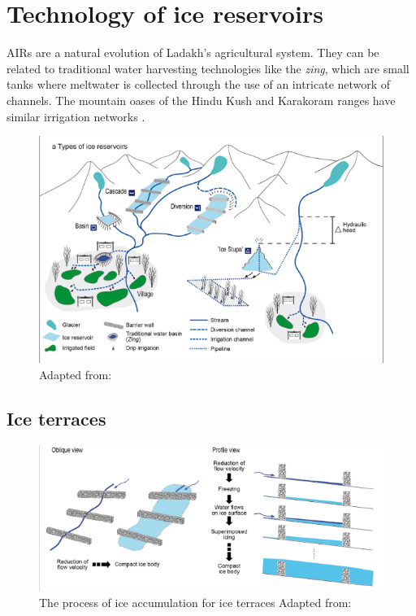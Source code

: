 \chapter{Technology of ice reservoirs}

AIRs are a natural evolution of Ladakh's agricultural system. They can be related to traditional water
harvesting technologies like the {\it zing}, which are small tanks where meltwater is collected through the use
of an intricate network of channels. The mountain oases of the Hindu Kush and Karakoram ranges
have similar irrigation networks \citep{nusserLocalKnowledgeGlobal2016}.

\begin{figure}[t]
\centering
\includegraphics[width=12cm]{Figures/AIR_designs.png}

\caption{Adapted from: \cite{nusserSociohydrologyArtificialGlaciers2019}}

\label{fig:AIRdesigns}
\end{figure}

\section{Ice terraces}


\begin{figure}[t]
\centering
\includegraphics[width=12cm]{Figures/IT_science.png}

\caption{ The process of ice accumulation for ice terraces Adapted from:
\cite{nusserSociohydrologyArtificialGlaciers2019}}

\label{fig:ITscience}
\end{figure}


